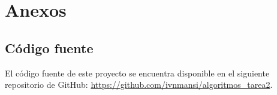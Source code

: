 \chapter{Anexos}
\section{Código fuente}
El código fuente de este proyecto se encuentra disponible en el siguiente repositorio de GitHub: \url{https://github.com/ivnmansi/algoritmos_tarea2}.